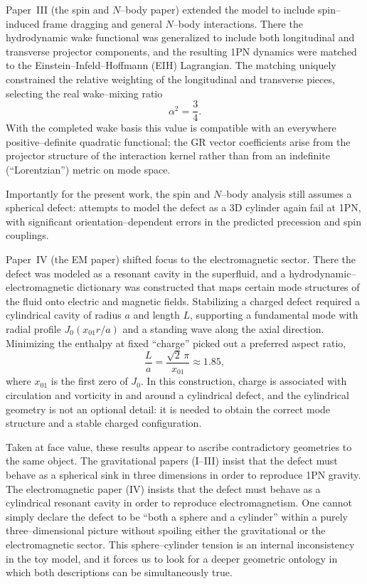 \documentclass[12pt]{article}
\begin{document}
Paper~III (the spin and $N$--body paper) extended the model to include
spin--induced frame dragging and general $N$--body interactions.  There the
hydrodynamic wake functional was generalized to include both longitudinal and
transverse projector components, and the resulting 1PN dynamics were matched
to the Einstein--Infeld--Hoffmann (EIH) Lagrangian.  The matching uniquely
constrained the relative weighting of the longitudinal and transverse pieces,
selecting the real wake--mixing ratio
\begin{equation}
  \alpha^2 = \frac{3}{4}.
\end{equation}
With the completed wake basis this value is compatible with an everywhere
positive--definite quadratic functional; the GR vector coefficients arise from
the projector structure of the interaction kernel rather than from an
indefinite (``Lorentzian'') metric on mode space.

Importantly for the present work, the spin and $N$--body
analysis still assumes a spherical defect: attempts to model the defect as a
3D cylinder again fail at 1PN, with significant orientation–dependent
errors in the predicted precession and spin couplings.

Paper~IV (the EM paper) shifted focus to the electromagnetic sector.  There
the defect was modeled as a resonant cavity in the superfluid, and a
hydrodynamic–electromagnetic dictionary was constructed that maps certain
mode structures of the fluid onto electric and magnetic fields.  Stabilizing
a charged defect required a cylindrical cavity of radius $a$ and length
$L$, supporting a fundamental mode with radial profile
$J_0(x_{01} r/a)$ and a standing wave along the axial direction.  Minimizing
the enthalpy at fixed ``charge'' picked out a preferred aspect ratio,
\begin{equation}
  \frac{L}{a} = \frac{\sqrt{2}\,\pi}{x_{01}} \approx 1.85,
\end{equation}
where $x_{01}$ is the first zero of $J_0$.  In this construction, charge is
associated with circulation and vorticity in and around a cylindrical
defect, and the cylindrical geometry is not an optional detail: it is needed
to obtain the correct mode structure and a stable charged configuration.

Taken at face value, these results appear to ascribe contradictory
geometries to the same object.  The gravitational papers (I--III) insist
that the defect must behave as a spherical sink in three dimensions in order
to reproduce 1PN gravity.  The electromagnetic paper (IV) insists that the
defect must behave as a cylindrical resonant cavity in order to reproduce
electromagnetism.  One cannot simply declare the defect to be ``both a
sphere and a cylinder'' within a purely three–dimensional picture without
spoiling either the gravitational or the electromagnetic sector.  This
sphere–cylinder tension is an internal inconsistency in the toy model, and
it forces us to look for a deeper geometric ontology in which both
descriptions can be simultaneously true.
\end{document}
